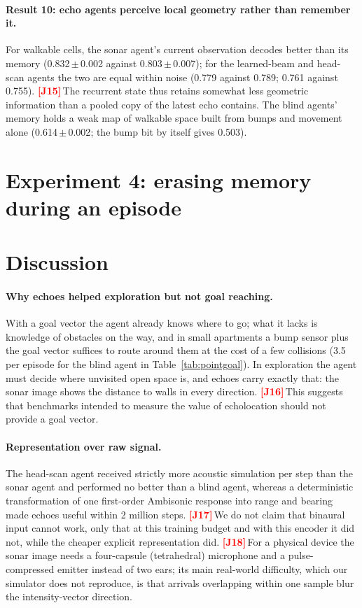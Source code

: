 \documentclass[10pt]{article}
\newif\ifreview \ifdefined\REVIEWMODE \reviewtrue \fi
\newcommand{\J}[1]{\ifreview\textcolor{red}{\textbf{[J#1]}}\,\fi}   %
\newcommand{\pmsd}[2]{#1\,{\scriptsize$\pm$\,#2}}
\begin{document}
\paragraph{Result 10: echo agents perceive local geometry rather than remember it.} For walkable cells, the sonar agent's current observation decodes better than its memory (\pmsd{0.832}{0.002} against \pmsd{0.803}{0.007}); for the learned-beam and head-scan agents the two are equal within noise (0.779 against 0.789; 0.761 against 0.755). \J{15}The recurrent state thus retains somewhat less geometric information than a pooled copy of the latest echo contains. The blind agents' memory holds a weak map of walkable space built from bumps and movement alone (\pmsd{0.614}{0.002}; the bump bit by itself gives 0.503).

\section{Experiment 4: erasing memory during an episode}
\label{sec:wipe}


\section{Discussion}

\paragraph{Why echoes helped exploration but not goal reaching.} With a goal vector the agent already knows where to go; what it lacks is knowledge of obstacles on the way, and in small apartments a bump sensor plus the goal vector suffices to route around them at the cost of a few collisions (3.5 per episode for the blind agent in Table~\ref{tab:pointgoal}). In exploration the agent must decide where unvisited open space is, and echoes carry exactly that: the sonar image shows the distance to walls in every direction. \J{16}This suggests that benchmarks intended to measure the value of echolocation should not provide a goal vector.

\paragraph{Representation over raw signal.} The head-scan agent received strictly more acoustic simulation per step than the sonar agent and performed no better than a blind agent, whereas a deterministic transformation of one first-order Ambisonic response into range and bearing made echoes useful within 2 million steps. \J{17}We do not claim that binaural input cannot work, only that at this training budget and with this encoder it did not, while the cheaper explicit representation did. \J{18}For a physical device the sonar image needs a four-capsule (tetrahedral) microphone and a pulse-compressed emitter instead of two ears; its main real-world difficulty, which our simulator does not reproduce, is that arrivals overlapping within one sample blur the intensity-vector direction.
\end{document}
